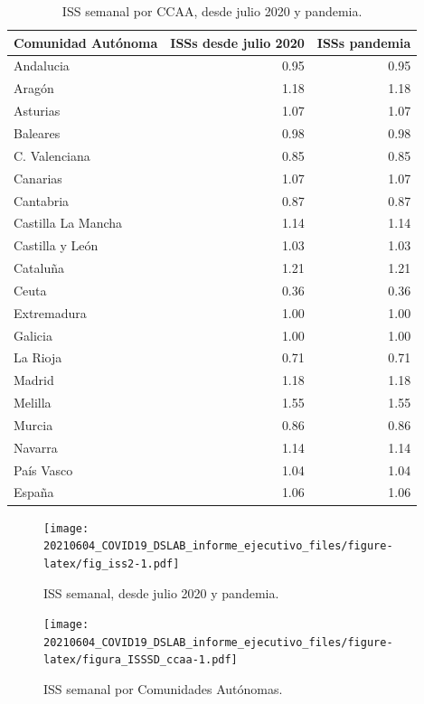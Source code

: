 \documentclass[
  11pt,
]{article}
\begin{document}
\begin{table}[!h]

\caption{\label{tab:tabla2}ISS semanal por CCAA, desde julio 2020 y pandemia.}
\centering
\fontsize{9}{11}\selectfont
\begin{tabular}[t]{l|r|r}
\hline
Comunidad Autónoma & ISSs desde julio 2020 & ISSs pandemia\\
\hline
Andalucia & 0.95 & 0.95\\
\hline
Aragón & 1.18 & 1.18\\
\hline
Asturias & 1.07 & 1.07\\
\hline
Baleares & 0.98 & 0.98\\
\hline
C. Valenciana & 0.85 & 0.85\\
\hline
Canarias & 1.07 & 1.07\\
\hline
Cantabria & 0.87 & 0.87\\
\hline
Castilla La Mancha & 1.14 & 1.14\\
\hline
Castilla y León & 1.03 & 1.03\\
\hline
Cataluña & 1.21 & 1.21\\
\hline
Ceuta & 0.36 & 0.36\\
\hline
Extremadura & 1.00 & 1.00\\
\hline
Galicia & 1.00 & 1.00\\
\hline
La Rioja & 0.71 & 0.71\\
\hline
Madrid & 1.18 & 1.18\\
\hline
Melilla & 1.55 & 1.55\\
\hline
Murcia & 0.86 & 0.86\\
\hline
Navarra & 1.14 & 1.14\\
\hline
País Vasco & 1.04 & 1.04\\
\hline
España & 1.06 & 1.06\\
\hline
\end{tabular}
\end{table}

\begin{figure}
\centering
\texttt{[image: 20210604\_COVID19\_DSLAB\_informe\_ejecutivo\_files/figure-latex/fig\_iss2-1.pdf]}
\caption{\label{fig:fig_iss2} ISS semanal, desde julio 2020 y pandemia.}
\end{figure}

\begin{figure}
\centering
\texttt{[image: 20210604\_COVID19\_DSLAB\_informe\_ejecutivo\_files/figure-latex/figura\_ISSSD\_ccaa-1.pdf]}
\caption{\label{fig:figura_ISSSD_ccaa} ISS semanal por Comunidades
Autónomas.}
\end{figure}
\end{document}
